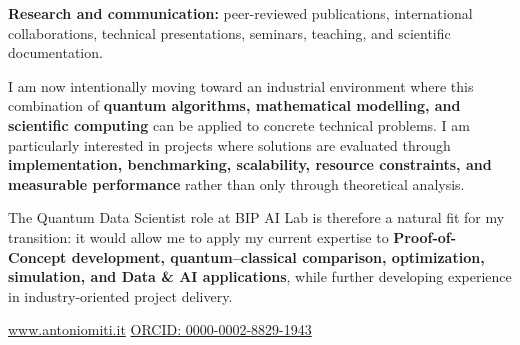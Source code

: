 \documentclass[10pt,a4paper]{article}
\begin{document}
\textbf{Research and communication:} peer-reviewed publications, international collaborations, technical presentations,
seminars, teaching, and scientific documentation.

I am now intentionally moving toward an industrial environment where this combination of \textbf{quantum algorithms,
mathematical modelling, and scientific computing} can be applied to concrete technical problems. I am particularly
interested in projects where solutions are evaluated through \textbf{implementation, benchmarking, scalability,
resource constraints, and measurable performance} rather than only through theoretical analysis.

The Quantum Data Scientist role at BIP AI Lab is therefore a natural fit for my transition: it would allow me to apply
my current expertise to \textbf{Proof-of-Concept development, quantum--classical comparison, optimization, simulation,
and Data \& AI applications}, while further developing experience in industry-oriented project delivery.

\vfill

\noindent
\href{https://www.antoniomiti.it/}{www.antoniomiti.it}
\hfill
\href{https://orcid.org/0000-0002-8829-1943}{ORCID: 0000-0002-8829-1943}
\end{document}
